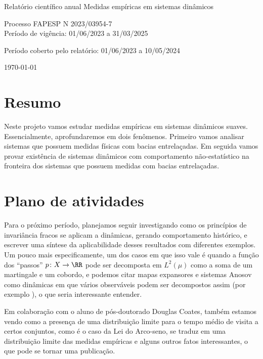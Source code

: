 \documentclass[a4paper,11pt,oneside]{memoir}
\begin{document}
\begin{titlingpage}
  \begin{center}
    \vspace*{0cm}
    {
      \Large
      Relatório científico anual
    }
    \vfill
    {
      \huge
      Medidas empíricas em sistemas dinâmicos\\[4cm]
    }
    {
      \large
      Processo FAPESP N\textordmasculine{} 2023/03954-7\\[1cm]
      
      Período de vigência: 01/06/2023 a 31/03/2025

      Período coberto pelo relatório: 01/06/2023 a 10/05/2024\\
    }
    \vfill
    \today
  \end{center}
\end{titlingpage}

\frontmatter

\tableofcontents

\mainmatter
\chapter{Resumo}
Neste projeto vamos estudar medidas empíricas em sistemas dinâmicos suaves. Essencialmente, aprofundaremos em dois fenômenos. Primeiro vamos analisar sistemas que possuem medidas físicas com bacias entrelaçadas. Em seguida vamos provar existência de sistemas dinâmicos com comportamento não-estatístico na fronteira dos sistemas que possuem medidas com bacias entrelaçadas. 


\chapter{Plano de atividades}
Para o próximo período, planejamos seguir investigando como os princípios de invariância fracos se aplicam a dinâmicas, gerando comportamento histórico, e escrever uma síntese da aplicabilidade desses resultados com diferentes exemplos. Um pouco mais especificamente, um dos casos em que isso vale é quando a função dos ``passos'' \(p \colon X \to \RR\) pode ser decomposta em \(L^2(\mu)\) como a soma de um martingale e um cobordo, e podemos citar mapas expansores e sistemas Anosov como dinâmicas em que vários observáveis podem ser decompostos assim (por exemplo \cite{vianaStochasticDynamicsDeterministic2021}), o que seria interessante entender.

Em colaboração com o aluno de pós-doutorado Douglas Coates, também estamos vendo como a presença de uma distribuição limite para o tempo médio de visita a certos conjuntos, como é o caso da Lei do Arco-seno, se traduz em uma distribuição limite das medidas empíricas e alguns outros fatos interessantes, o que pode se tornar uma publicação.
\end{document}

